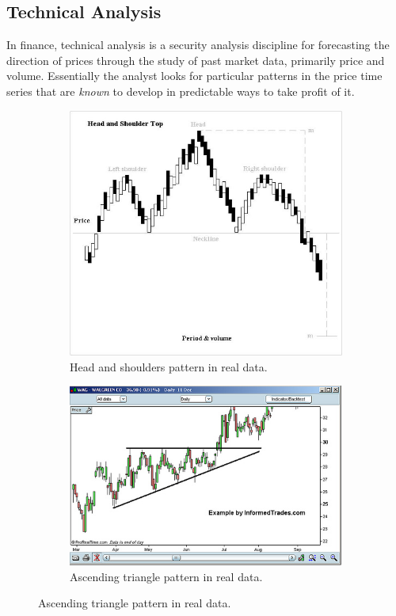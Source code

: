 \documentclass[11pt]{article}
\begin{document}
    
    \hypertarget{technical-analysis}{%
\subsection{Technical Analysis}\label{technical-analysis}}

In finance, technical analysis is a security analysis discipline for
forecasting the direction of prices through the study of past market
data, primarily price and volume. Essentially the analyst looks for
particular patterns in the price time series that are \emph{known} to
develop in predictable ways to take profit of it.

\begin{figure}
  \begin{subfigure}{.5\textwidth}
    \centering
    \includegraphics[width=0.8\linewidth]{H_and_s_top_new.jpg}
    \caption{Head and shoulders pattern in real data.}
  \end{subfigure}
  \begin{subfigure}{.5\textwidth}
    \centering
    \includegraphics[width=0.8\linewidth]{Triangle-ascending.jpg}
    \caption{Ascending triangle pattern in real data.}
  \end{subfigure}
\end{figure}
\end{document}
